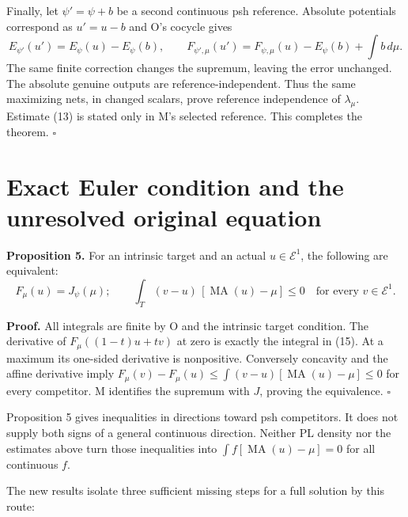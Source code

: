 \documentclass[
  11pt,
]{article}
\begin{document}
Finally, let \(\psi'=\psi+b\) be a second continuous psh reference.
Absolute potentials correspond as \(u'=u-b\) and O's cocycle gives \[
 E_{\psi'}(u')=E_\psi(u)-E_\psi(b),\qquad
 F_{\psi',\mu}(u')=F_{\psi,\mu}(u)-E_\psi(b)+\int b\,d\mu.
\] The same finite correction changes the supremum, leaving the error
unchanged. The absolute genuine outputs are reference-independent. Thus
the same maximizing nets, in changed scalars, prove reference
independence of \(\lambda_\mu\). Estimate (13) is stated only in M's
selected reference. This completes the theorem. \(\square\)

\section{Exact Euler condition and the unresolved original
equation}\label{exact-euler-condition-and-the-unresolved-original-equation}

\textbf{Proposition 5.} For an intrinsic target and an actual
\(u\in\mathcal E^1\), the following are equivalent: \[
 F_\mu(u)=J_\psi(\mu);
 \qquad
 \int_T(v-u)\,[\operatorname{MA}(u)-\mu]\leq0
                    \quad\text{for every }v\in\mathcal E^1.   \tag{15}
\]

\textbf{Proof.} All integrals are finite by O and the intrinsic target
condition. The derivative of \(F_\mu((1-t)u+tv)\) at zero is exactly the
integral in (15). At a maximum its one-sided derivative is nonpositive.
Conversely concavity and the affine derivative imply
\(F_\mu(v)-F_\mu(u)\leq\int(v-u)[\operatorname{MA}(u)-\mu]\leq0\) for
every competitor. M identifies the supremum with \(J\), proving the
equivalence. \(\square\)

Proposition 5 gives inequalities in directions toward psh competitors.
It does not supply both signs of a general continuous direction. Neither
PL density nor the estimates above turn those inequalities into
\(\int f[\operatorname{MA}(u)-\mu]=0\) for all continuous \(f\).

The new results isolate three sufficient missing steps for a full
solution by this route:
\end{document}
